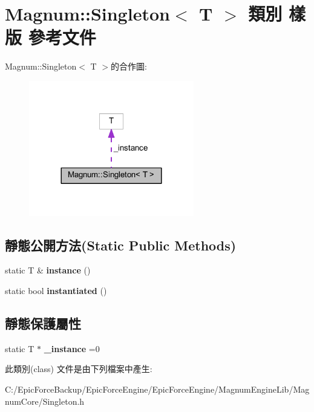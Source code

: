 \hypertarget{class_magnum_1_1_singleton}{}\section{Magnum\+:\+:Singleton$<$ T $>$ 類別 樣版 參考文件}
\label{class_magnum_1_1_singleton}


Magnum\+:\+:Singleton$<$ T $>$的合作圖\+:\nopagebreak
\begin{figure}[H]
\begin{center}
\leavevmode
\includegraphics[width=204pt]{class_magnum_1_1_singleton__coll__graph}
\end{center}
\end{figure}
\subsection*{靜態公開方法(Static Public Methods)}
\begin{DoxyCompactItemize}
\item 
static T \& {\bfseries instance} ()\hypertarget{class_magnum_1_1_singleton_a5cd55474415945260ffff61d9febaf9b}{}\label{class_magnum_1_1_singleton_a5cd55474415945260ffff61d9febaf9b}

\item 
static bool {\bfseries instantiated} ()\hypertarget{class_magnum_1_1_singleton_aa31eeaa330c36e93f6ffbd67339c9c25}{}\label{class_magnum_1_1_singleton_aa31eeaa330c36e93f6ffbd67339c9c25}

\end{DoxyCompactItemize}
\subsection*{靜態保護屬性}
\begin{DoxyCompactItemize}
\item 
static T $\ast$ {\bfseries \+\_\+instance} =0\hypertarget{class_magnum_1_1_singleton_a69e964bda0b08d2afce93cb4236d0ad2}{}\label{class_magnum_1_1_singleton_a69e964bda0b08d2afce93cb4236d0ad2}

\end{DoxyCompactItemize}


此類別(class) 文件是由下列檔案中產生\+:\begin{DoxyCompactItemize}
\item 
C\+:/\+Epic\+Force\+Backup/\+Epic\+Force\+Engine/\+Epic\+Force\+Engine/\+Magnum\+Engine\+Lib/\+Magnum\+Core/Singleton.\+h\end{DoxyCompactItemize}
